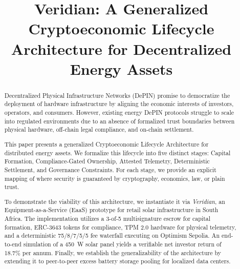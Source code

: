 \documentclass[conference]{IEEEtran}
\begin{document}

\title{Veridian: A Generalized Cryptoeconomic Lifecycle Architecture for Decentralized Energy Assets}

\author{%
\and
{}
\and
{}
}

\maketitle

\begin{abstract}
Decentralized Physical Infrastructure Networks (DePIN) promise to democratize the deployment of hardware infrastructure by aligning the economic interests of investors, operators, and consumers. However, existing energy DePIN protocols struggle to scale into regulated environments due to an absence of formalized trust boundaries between physical hardware, off-chain legal compliance, and on-chain settlement. 

This paper presents a generalized Cryptoeconomic Lifecycle Architecture for distributed energy assets. We formalize this lifecycle into five distinct stages: Capital Formation, Compliance-Gated Ownership, Attested Telemetry, Deterministic Settlement, and Governance Constraints. For each stage, we provide an explicit mapping of where security is guaranteed by cryptography, economics, law, or plain trust.

To demonstrate the viability of this architecture, we instantiate it via \emph{Veridian}, an Equipment-as-a-Service (EaaS) prototype for retail solar infrastructure in South Africa. The implementation utilizes a 3-of-5 multisignature escrow for capital formation, ERC-3643 tokens for compliance, TPM 2.0 hardware for physical telemetry, and a deterministic 75/8/7/5/5 fee waterfall executing on Optimism Sepolia. An end-to-end simulation of a 450~W solar panel yields a verifiable net investor return of 18.7\% per annum. Finally, we establish the generalizability of the architecture by extending it to peer-to-peer excess battery storage pooling for localized data centers.
\end{abstract}
\end{document}
